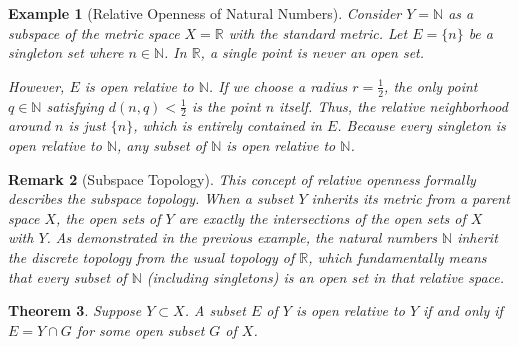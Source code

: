 \documentclass{article}
\theoremstyle{mythm}
\newtheorem{theorem}{Theorem}[section]
\newtheorem{remark}[theorem]{Remark}
\newtheorem{example}[theorem]{Example}
\begin{document}
\begin{example}[Relative Openness of Natural Numbers]
Consider $Y = \mathbb{N}$ as a subspace of the metric space $X = \mathbb{R}$ with the standard metric. Let $E = \{n\}$ be a singleton set where $n \in \mathbb{N}$. In $\mathbb{R}$, a single point is never an open set. 

However, $E$ is open relative to $\mathbb{N}$. If we choose a radius $r = \frac{1}{2}$, the only point $q \in \mathbb{N}$ satisfying $d(n, q) < \frac{1}{2}$ is the point $n$ itself. Thus, the relative neighborhood around $n$ is just $\{n\}$, which is entirely contained in $E$. Because every singleton is open relative to $\mathbb{N}$, any subset of $\mathbb{N}$ is open relative to $\mathbb{N}$.
\end{example}

\begin{remark}[Subspace Topology]
This concept of relative openness formally describes the \textit{subspace topology}. When a subset $Y$ inherits its metric from a parent space $X$, the open sets of $Y$ are exactly the intersections of the open sets of $X$ with $Y$. As demonstrated in the previous example, the natural numbers $\mathbb{N}$ inherit the \textit{discrete topology} from the usual topology of $\mathbb{R}$, which fundamentally means that every subset of $\mathbb{N}$ (including singletons) is an open set in that relative space.
\end{remark}
\begin{theorem}
Suppose $Y \subset X$. A subset $E$ of $Y$ is open relative to $Y$ if and only if $E = Y \cap G$ for some open subset $G$ of $X$.
\end{theorem}
\end{document}

